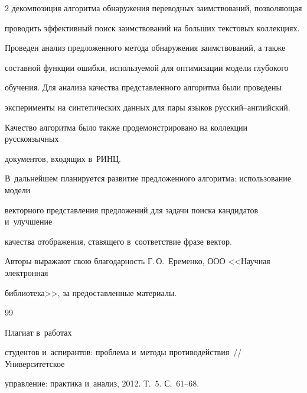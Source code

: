 \begin{multicols}{2}
декомпозиция алгоритма обнаружения переводных заимствований, позволяющая 


проводить эффективный поиск заимствований на больших текстовых коллекциях. 


Проведен анализ предложенного метода обнаружения заимствований, а также 


составной функции ошибки, используемой для оптимизации модели глубокого 


обучения.  Для анализа качества представленного алгоритма были проведены 


эксперименты на синтетических данных для пары языков рус\-ский--анг\-лий\-ский. 


Качество алгоритма было также продемонстрировано на коллекции русскоязычных 


документов, входящих в~РИНЦ.


В~дальнейшем планируется развитие предложенного алгоритма: использование модели 


векторного представления предложений для задачи поиска кандидатов и~улучшение 


качества отображения, ставящего в~соответствие фразе вектор.\\





\bigskip





Авторы выражают свою благодарность Г.\,О.~Еременко, ООО <<Научная электронная 


библиотека>>, за предоставленные материалы.





{\small\frenchspacing


{%




\begin{thebibliography}{99}







 Плагиат в~работах 


студентов и~аспирантов: проблема и~методы противодействия~// Университетское 


управление: практика и~анализ, 2012. Т.~5. С.~61--68.






\end{thebibliography}}}
\end{multicols}
